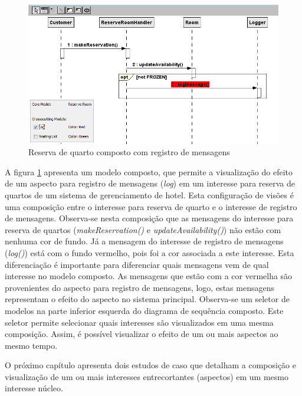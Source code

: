 \begin{landscape}
  \begin{figure}[tb]
	\centering
	\includegraphics{img/case_study_compound_1.png}
	\caption{Reserva de quarto composto com registro de mensagens}\label{fig:case_study_compound_1}
  \end{figure}
\end{landscape}

A figura \ref{fig:case_study_compound_1} apresenta um modelo composto, que permite a visualização do efeito de um aspecto para registro de mensagens
(\textit{log}) em um interesse para reserva de quartos de um sistema de gerenciamento de hotel. Esta configuração de visões é uma composição
entre o interesse para reserva de quarto e o interesse de registro de mensagens. Observa-se nesta composição que as mensagens do interesse para reserva de 
quartos (\textit{makeReservation()} e \textit{updateAvailability()}) não estão com nenhuma cor de fundo. Já a mensagem do interesse de registro de
mensagens (\textit{log()}) está com o fundo vermelho, pois foi a cor associada a este interesse. Esta diferenciação é importante para diferenciar quais mensagens 
vem de qual interesse no modelo composto. As mensagens que estão com a cor vermelha são provenientes do aspecto para registro de mensagens, logo,
estas mensagens representam o efeito do aspecto no sistema principal. Observa-se um seletor de modelos na parte inferior esquerda do diagrama de
sequência composto. Este seletor permite selecionar quais interesses são visualizados em uma mesma composição. Assim, é possível visualizar o efeito
de um ou mais aspectos ao mesmo tempo. 

O próximo capítulo apresenta dois estudos de caso que detalham a composição e visualização de um ou mais interesses entrecortantes (aspectos) em um
mesmo interesse núcleo.
